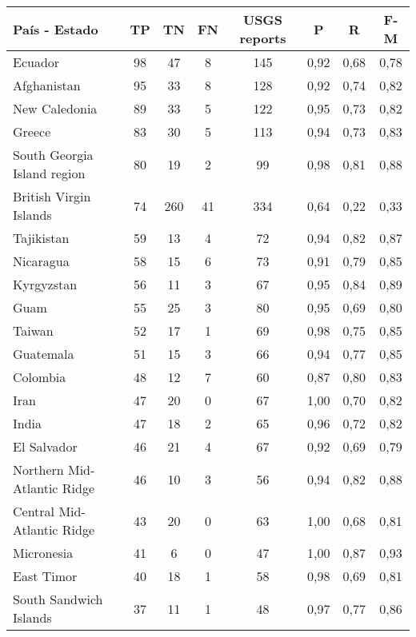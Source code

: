 {\small
\begin{table}[!ht]
\centering
  \begin{tabular}{|l|ccc|c|ccc|}
  \hline
  País - Estado & TP & TN & FN & USGS reports & P & R & F-M \\
  \hline \hline
Ecuador	 & 98 	 & 47 	 & 8 	& 145	 & 0,92 &	0,68 &	0,78 \\ \hline
Afghanistan	 & 95 	 & 33 	 & 8 	& 128	 & 0,92 &	0,74 &	0,82 \\ \hline
New Caledonia	 & 89 	 & 33 	 & 5 	& 122	 & 0,95 &	0,73 &	0,82 \\ \hline
Greece	 & 83 	 & 30 	 & 5 	& 113	 & 0,94 &	0,73 &	0,83 \\ \hline
South Georgia Island region	 & 80 	 & 19 	 & 2 	& 99	 & 0,98 &	0,81 &	0,88 \\ \hline
British Virgin Islands	 & 74 	 & 260 	 & 41 	& 334	 & 0,64 &	0,22 &	0,33 \\ \hline
Tajikistan	 & 59 	 & 13 	 & 4 	& 72	 & 0,94 &	0,82 &	0,87 \\ \hline
Nicaragua	 & 58 	 & 15 	 & 6 	& 73	 & 0,91 &	0,79 &	0,85 \\ \hline
Kyrgyzstan	 & 56 	 & 11 	 & 3 	& 67	 & 0,95 &	0,84 &	0,89 \\ \hline
Guam	 & 55 	 & 25 	 & 3 	& 80	 & 0,95 &	0,69 &	0,80 \\ \hline
Taiwan	 & 52 	 & 17 	 & 1 	& 69	 & 0,98 &	0,75 &	0,85 \\ \hline
Guatemala	 & 51 	 & 15 	 & 3 	& 66	 & 0,94 &	0,77 &	0,85 \\ \hline
Colombia	 & 48 	 & 12 	 & 7 	& 60	 & 0,87 &	0,80 &	0,83 \\ \hline
Iran	 & 47 	 & 20 	 & 0   	& 67	 & 1,00 &	0,70 &	0,82 \\ \hline
India	 & 47 	 & 18 	 & 2 	& 65	 & 0,96 &	0,72 &	0,82 \\ \hline
El Salvador	 & 46 	 & 21 	 & 4 	& 67	 & 0,92 &	0,69 &	0,79 \\ \hline
Northern Mid-Atlantic Ridge	 & 46 	 & 10 	 & 3 	& 56	 & 0,94 &	0,82 &	0,88 \\ \hline
Central Mid-Atlantic Ridge	 & 43 	 & 20 	 & 0   	& 63	 & 1,00 &	0,68 &	0,81 \\ \hline
Micronesia	 & 41 	 & 6 	 & 0   	& 47	 & 1,00 &	0,87 &	0,93 \\ \hline
East Timor	 & 40 	 & 18 	 & 1 	& 58	 & 0,98 &	0,69 &	0,81 \\ \hline
South Sandwich Islands	 & 37 	 & 11 	 & 1 	& 48	 & 0,97 &	0,77 &	0,86 \\ \hline

\end{tabular}
\end{table}}
